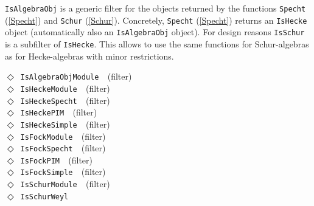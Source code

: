 \documentclass[a4paper,11pt]{report}
\begin{document}
{{{ \texttt{IsAlgebraObj} is a generic filter for the objects returned by the functions \texttt{Specht} (\ref{Specht}) and \texttt{Schur} (\ref{Schur}). Concretely, \texttt{Specht} (\ref{Specht}) returns an \texttt{IsHecke} object (automatically also an \texttt{IsAlgebraObj} object). For design reasons \texttt{IsSchur} is a subfilter of \texttt{IsHecke}. This allows to use the same functions for Schur-algebras as for
Hecke-algebras with minor restrictions.

 \noindent\textcolor{FuncColor}{$\Diamond$\ \texttt{IsAlgebraObjModule
\label{IsAlgebraObjModule}
}\hfill{\scriptsize (filter)}}\\
\noindent\textcolor{FuncColor}{$\Diamond$\ \texttt{IsHeckeModule
\label{IsHeckeModule}
}\hfill{\scriptsize (filter)}}\\
\noindent\textcolor{FuncColor}{$\Diamond$\ \texttt{IsHeckeSpecht
\label{IsHeckeSpecht}
}\hfill{\scriptsize (filter)}}\\
\noindent\textcolor{FuncColor}{$\Diamond$\ \texttt{IsHeckePIM
\label{IsHeckePIM}
}\hfill{\scriptsize (filter)}}\\
\noindent\textcolor{FuncColor}{$\Diamond$\ \texttt{IsHeckeSimple
\label{IsHeckeSimple}
}\hfill{\scriptsize (filter)}}\\
\noindent\textcolor{FuncColor}{$\Diamond$\ \texttt{IsFockModule
\label{IsFockModule}
}\hfill{\scriptsize (filter)}}\\
\noindent\textcolor{FuncColor}{$\Diamond$\ \texttt{IsFockSpecht
\label{IsFockSpecht}
}\hfill{\scriptsize (filter)}}\\
\noindent\textcolor{FuncColor}{$\Diamond$\ \texttt{IsFockPIM
\label{IsFockPIM}
}\hfill{\scriptsize (filter)}}\\
\noindent\textcolor{FuncColor}{$\Diamond$\ \texttt{IsFockSimple
\label{IsFockSimple}
}\hfill{\scriptsize (filter)}}\\
\noindent\textcolor{FuncColor}{$\Diamond$\ \texttt{IsSchurModule
\label{IsSchurModule}
}\hfill{\scriptsize (filter)}}\\
\noindent\textcolor{FuncColor}{$\Diamond$\ \texttt{IsSchurWeyl
}}}}}
\end{document}
